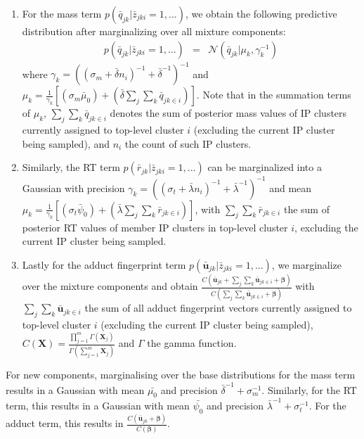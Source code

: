 \begin{enumerate}
\item For the mass term $p({\bar{q}}_{jk}\vert\bar{z}_{jki}=1,...)$, we obtain the following predictive distribution after marginalizing over all mixture components: \begin{eqnarray} p({\bar{q}}_{jk}\vert\bar{z}_{jki}=1,...) & = & \mathcal{N}({\bar{q}}_{jk}|\mu_{k},\gamma_{k}^{-1})\label{eq:15-2} \end{eqnarray} where $\gamma_{k}=((\sigma_{m}+\bar{\delta}n_{i})^{-1}+\bar{\delta}^{-1})^{-1}$ and $\mu_{k}=\frac{1}{\gamma_{k}}\left[(\sigma_{m}\bar{\mu}_{0})+(\bar{\delta}\sum_{j}\sum_{k}\bar{q}_{jk\in i})\right]$. Note that in the summation terms of $\mu_{k}$, $\sum_{j}\sum_{k}\bar{q}_{jk\in i}$ denotes the sum of posterior mass values of IP clusters currently assigned to top-level cluster $i$ (excluding the current IP cluster being sampled), and $n_{i}$ the count of such IP clusters. 
\item Similarly, the RT term $p({\bar{r}}_{jk}\vert\bar{z}_{jki}=1,...)$ can be marginalized into a Gaussian with precision $\gamma_{k}=((\sigma_{t}+\bar{\lambda}n_{i})^{-1}+\bar{\lambda}^{-1})^{-1}$ and mean $\mu_{k}=\frac{1}{\gamma_{k}}\left[(\sigma_{t}\bar{\psi}_{0})+(\bar{\lambda}\sum_{j}\sum_{k}\bar{r}_{jk\in i})\right]$, with $\sum_{j}\sum_{k}\bar{r}_{jk\in i}$ the sum of posterior RT values of member IP clusters in top-level cluster $i$, excluding the current IP cluster being sampled.
\item Lastly for the adduct fingerprint term $p({\boldsymbol{\bar{u}}}_{jk}\vert\bar{z}_{jki}=1,...)$, we marginalize over the mixture components and obtain $\frac{C\left({\boldsymbol{\bar{u}}}_{jk}+\sum_{j}\sum_{k}\boldsymbol{\bar{u}}_{jk\in i}+\boldsymbol{\beta}\right)}{C\left(\sum_{j}\sum_{k}\boldsymbol{\bar{u}}_{jk\in i}+\boldsymbol{\beta}\right)}$ with $\sum_{j}\sum_{k}\boldsymbol{\bar{u}}_{jk\in i}$ the sum of all adduct fingerprint vectors currently assigned to top-level cluster $i$ (excluding the current IP cluster being sampled), $C(\boldsymbol{X})=\frac{\prod_{j=1}^{m}\Gamma(\boldsymbol{X}_{j})}{\Gamma(\sum_{j=1}^{m}\boldsymbol{X}_{j})}$ and $\Gamma$ the gamma function.
\end{enumerate}
For new components, marginalising over the base distributions for the mass term results in a Gaussian with mean $\bar{\mu_{0}}$ and precision $\bar{\delta}^{-1}+\sigma_{m}^{-1}$. Similarly, for the RT term, this results in a Gaussian with mean $\bar{\psi_{0}}$ and precision $\bar{\lambda}^{-1}+\sigma_{t}^{-1}$. For the adduct term, this results in $\frac{C\left({\boldsymbol{\bar{u}}}_{jk}+\boldsymbol{\beta}\right)}{C\left(\boldsymbol{\beta}\right)}$.

